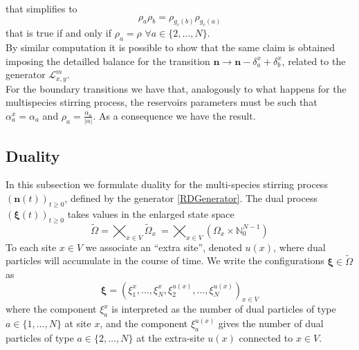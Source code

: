 \documentclass[11pt]{article}
\numberwithin{equation}{section}
\numberwithin{equation}{subsection}
\begin{document}
that simplifies to 
\begin{equation}
	\rho_{a}\rho_{b}=\rho_{g_{c}(b)}\rho_{g_{c}(a)}
\end{equation}
that is true if and only if $\rho_{a}=\rho$ $\forall a\in \{2,\ldots,N\}$.\\
By similar computation it is possible to show that the same claim is obtained imposing the detailled balance for the transition $\bm{n}\to \bm{n}-\delta_{a}^{x}+\delta_{b}^{x}$, related to the generator $\mathcal{L}^{m}_{x,y}$. \\
For the boundary transitions we have that, analogously to what happens for the multispecies stirring process, the reservoirs parameters must be such that $\alpha_{a}^{x}=\alpha_{a}$ and $\rho_{a}=\frac{\alpha_{a}}{|\alpha|}$. As a consequence we have the result. 
\subsection{Duality}
In this subsection we formulate duality for the multi-species stirring process $(\bm{n}(t))_{t\geq 0}$, defined by the generator \eqref{RDGenerator}.
The dual  process $(\bm{\xi}(t))_{t\geq 0}$ takes values in the enlarged state space
\begin{equation}
	\widetilde{\Omega}= \bigtimes_{x\in V} \widetilde{\Omega}_{x}\ = \bigtimes_{x\in V} (\Omega_{x}\times \mathbb{N}_{0}^{N-1})
\end{equation}
To each site $x\in V$ we associate an ``extra site'', denoted $u(x)$,
where dual particles will accumulate in the course of time. 
We write the configurations $\bm{\xi} \in \widetilde\Omega$  as
\begin{equation}
	\bm{\xi}=\left(\xi_{1}^{x},\ldots,\xi_{N}^{x},\xi_{2}^{u(x)},\ldots,\xi_{N}^{u(x)}\right)_{x\in V}
\end{equation}
where the component $\xi_{a}^{x}$ is interpreted as the number of dual particles of type $a\in \{1,\ldots,N\}$ at site $x$, 
and the component $\xi_{a}^{u(x)}$  gives the number of dual particles of type $a\in \{2,\ldots,N\}$ at 
the extra-site $u(x)$ connected to $x\in V$.
\end{document}
